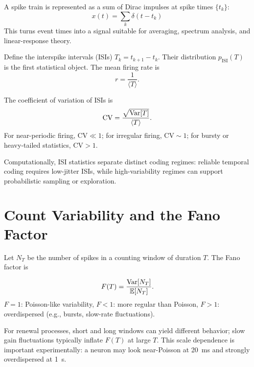 A spike train is represented as a sum of Dirac impulses at spike times $\{t_k\}$:
%
\begin{equation}
  x(t) = \sum_k \delta(t - t_k)
  \label{eq:spike-train-delta}
\end{equation}
%
This turns event times into a signal suitable for averaging, spectrum analysis, and linear-response theory.

Define the interspike intervals (ISIs) $T_k = t_{k+1}-t_k$. Their distribution $p_{\text{ISI}}(T)$ is the first statistical object. The mean firing rate is
%
\begin{equation}
  r = \frac{1}{\langle T \rangle}.
  \label{eq:rate-isi}
\end{equation}
%

The coefficient of variation of ISIs is
%
\begin{equation}
  \mathrm{CV} = \frac{\sqrt{\operatorname{Var}[T]}}{\langle T \rangle}.
  \label{eq:cv}
\end{equation}
%
For near-periodic firing, $\mathrm{CV}\ll 1$; for irregular firing, $\mathrm{CV}\sim 1$; for bursty or heavy-tailed statistics, $\mathrm{CV}>1$.

Computationally, ISI statistics separate distinct coding regimes: reliable temporal coding requires low-jitter ISIs, while high-variability regimes can support probabilistic sampling or exploration.

\section{Count Variability and the Fano Factor}
\label{sec:fano}

Let $N_T$ be the number of spikes in a counting window of duration $T$. The Fano factor is
%
\begin{keyequation}
\begin{equation}
  F(T) = \frac{\operatorname{Var}[N_T]}{\mathbb{E}[N_T]}.
  \label{eq:fano}
\end{equation}
\tcblower
$F=1$: Poisson-like variability, \quad
$F<1$: more regular than Poisson, \quad
$F>1$: overdispersed (e.g., bursts, slow-rate fluctuations).
\end{keyequation}

For renewal processes, short and long windows can yield different behavior; slow gain fluctuations typically inflate $F(T)$ at large $T$. This scale dependence is important experimentally: a neuron may look near-Poisson at 20~ms and strongly overdispersed at 1~s.

